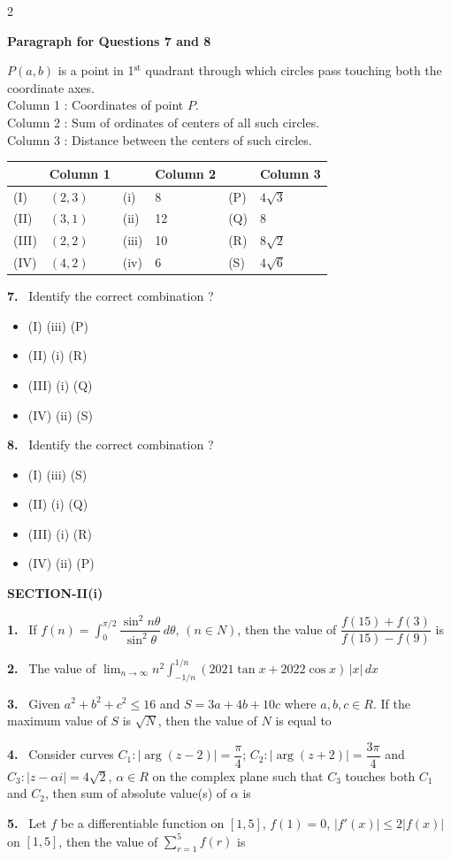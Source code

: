 \documentclass[10pt]{extarticle}
\newcommand{\sect}[1]{\par\smallskip\noindent\textbf{#1}\par}
\newcommand{\qn}[1]{\par\smallskip\noindent\textbf{#1.}~}
\newcommand{\paraq}[2]{\par\smallskip\noindent\textbf{Paragraph for Questions #1 and #2}\par}
\newenvironment{qoptions}{\begin{itemize}[leftmargin=1.8em,itemsep=1pt,topsep=2pt,label={}]}{\end{itemize}}
\newcommand{\opt}[2]{\item[(#1)] #2}
\begin{document}
\begin{multicols}{2}
\paraq{7}{8}
$P(a,b)$ is a point in 1$^{\text{st}}$ quadrant through which circles pass touching both the coordinate axes.\\
Column 1 : Coordinates of point $P$.\\
Column 2 : Sum of ordinates of centers of all such circles.\\
Column 3 : Distance between the centers of such circles.
\begin{center}\footnotesize
\begin{tabular}{|p{0.6cm}|p{1.4cm}|p{0.6cm}|p{1.4cm}|p{0.5cm}|p{1.8cm}|}
\hline
 & \centering Column 1 & & \centering Column 2 & & \centering Column 3\tabularnewline
\hline
(I) & $(2,3)$ & (i) & 8 & (P) & $4\sqrt3$\\
(II) & $(3,1)$ & (ii) & 12 & (Q) & 8\\
(III) & $(2,2)$ & (iii) & 10 & (R) & $8\sqrt2$\\
(IV) & $(4,2)$ & (iv) & 6 & (S) & $4\sqrt6$\\
\hline
\end{tabular}
\end{center}

\qn{7} Identify the correct combination ?
\begin{qoptions}
\opt{A}{(I) (iii) (P)}
\opt{B}{(II) (i) (R)}
\opt{C}{(III) (i) (Q)}
\opt{D}{(IV) (ii) (S)}
\end{qoptions}

\qn{8} Identify the correct combination ?
\begin{qoptions}
\opt{A}{(I) (iii) (S)}
\opt{B}{(II) (i) (Q)}
\opt{C}{(III) (i) (R)}
\opt{D}{(IV) (ii) (P)}
\end{qoptions}

\sect{SECTION-II(i)}
\qn{1} If $f(n)=\displaystyle\int_0^{\pi/2}\dfrac{\sin^2n\theta}{\sin^2\theta}\,d\theta$, $(n\in N)$, then the value of $\dfrac{f(15)+f(3)}{f(15)-f(9)}$ is

\qn{2} The value of $\displaystyle\lim_{n\to\infty}n^2\int_{-1/n}^{1/n}(2021\tan x+2022\cos x)\,|x|\,dx$

\qn{3} Given $a^2+b^2+c^2\le16$ and $S=3a+4b+10c$ where $a,b,c\in R$. If the maximum value of $S$ is $\sqrt N$, then the value of $N$ is equal to

\qn{4} Consider curves $C_1:|\arg(z-2)|=\dfrac\pi4$; $C_2:|\arg(z+2)|=\dfrac{3\pi}4$ and $C_3:|z-\alpha i|=4\sqrt2$, $\alpha\in R$ on the complex plane such that $C_3$ touches both $C_1$ and $C_2$, then sum of absolute value(s) of $\alpha$ is

\qn{5} Let $f$ be a differentiable function on $[1,5]$, $f(1)=0$, $|f'(x)|\le2|f(x)|$ on $[1,5]$, then the value of $\displaystyle\sum_{r=1}^5f(r)$ is


\end{multicols}
\end{document}
